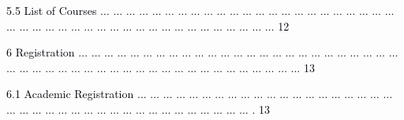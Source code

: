 \documentclass[12pt]{article}
\begin{document}
\vspace{\baselineskip}
\begin{adjustwidth}{0.21in}{0.0in}
{\fontsize{7pt}{8.4pt}\selectfont \textcolor[HTML]{00000A}{5.5 List of Courses $ \ldots $ $ \ldots $ $ \ldots $ $ \ldots $ $ \ldots $ $ \ldots $ $ \ldots $ $ \ldots $ $ \ldots $ $ \ldots $ $ \ldots $ $ \ldots $ $ \ldots $ $ \ldots $ $ \ldots $ $ \ldots $ $ \ldots $ $ \ldots $ $ \ldots $ $ \ldots $ $ \ldots $ $ \ldots $ $ \ldots $ $ \ldots $ $ \ldots $ $ \ldots $ $ \ldots $ $ \ldots $ $ \ldots $ $ \ldots $ $ \ldots $ $ \ldots $ $ \ldots $ $ \ldots $ $ \ldots $ $ \ldots $ $ \ldots $ $ \ldots $ $ \ldots $ $ \ldots $ $ \ldots $ $ \ldots $ $ \ldots $ $ \ldots $  12}\par}\par

\end{adjustwidth}


\vspace{\baselineskip}
{\fontsize{7pt}{8.4pt}\selectfont \textcolor[HTML]{00000A}{6 Registration $ \ldots $ $ \ldots $ $ \ldots $ $ \ldots $ $ \ldots $ $ \ldots $ $ \ldots $ $ \ldots $ $ \ldots $ $ \ldots $ $ \ldots $ $ \ldots $ $ \ldots $ $ \ldots $ $ \ldots $ $ \ldots $ $ \ldots $ $ \ldots $ $ \ldots $ $ \ldots $ $ \ldots $ $ \ldots $ $ \ldots $ $ \ldots $ $ \ldots $ $ \ldots $ $ \ldots $ $ \ldots $ $ \ldots $ $ \ldots $ $ \ldots $ $ \ldots $ $ \ldots $ $ \ldots $ $ \ldots $ $ \ldots $ $ \ldots $ $ \ldots $ $ \ldots $ $ \ldots $ $ \ldots $ $ \ldots $ $ \ldots $ $ \ldots $ $ \ldots $ $ \ldots $ $ \ldots $ ... 13}\par}\par


\vspace{\baselineskip}
\begin{adjustwidth}{0.21in}{0.0in}
{\fontsize{7pt}{8.4pt}\selectfont \textcolor[HTML]{00000A}{6.1 Academic Registration $ \ldots $ $ \ldots $ $ \ldots $ $ \ldots $ $ \ldots $ $ \ldots $ $ \ldots $ $ \ldots $ $ \ldots $ $ \ldots $ $ \ldots $ $ \ldots $ $ \ldots $ $ \ldots $ $ \ldots $ $ \ldots $ $ \ldots $ $ \ldots $ $ \ldots $ $ \ldots $ $ \ldots $ $ \ldots $ $ \ldots $ $ \ldots $ $ \ldots $ $ \ldots $ $ \ldots $ $ \ldots $ $ \ldots $ $ \ldots $ $ \ldots $ $ \ldots $ $ \ldots $ $ \ldots $ $ \ldots $ $ \ldots $ $ \ldots $ $ \ldots $ $ \ldots $ . 13}\par}\par

\end{adjustwidth}
\end{document}
